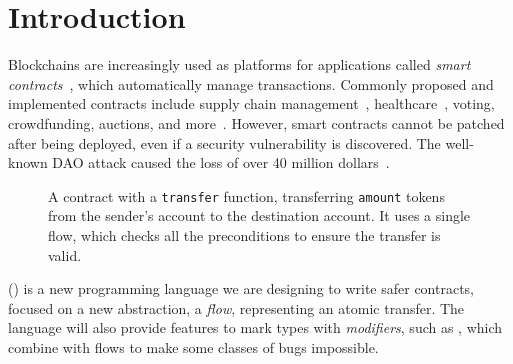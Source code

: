 \documentclass[dvipsnames, sigplan, screen]{acmart}
\begin{document}
\section{Introduction}
Blockchains are increasingly used as platforms for applications called \emph{smart contracts}~\cite{Szabo97:Formalizing}, which automatically manage transactions. %
Commonly proposed and implemented contracts include supply chain management~\cite{SupplyChainUse}, healthcare~\cite{HealthcareUse}, voting, crowdfunding, auctions, and more~\cite{Elsden18:Making}.
However, smart contracts cannot be patched after being deployed, even if a security vulnerability is discovered.
The well-known DAO attack caused the loss of over 40 million dollars~\cite{DAO}.
\begin{figure}[!b]
    \centering
    
    \vspace{-1em}
    \caption{A \langName contract with a \lstinline{transfer} function, transferring \lstinline{amount} tokens from the sender's account to the destination account.
It uses a single flow, which checks all the preconditions to ensure the transfer is valid.}
    \label{fig:erc20-transfer-flow}
\end{figure}

\langName (\langNamePronounce) is a new programming language we are designing to write safer contracts, focused on a new abstraction, a \emph{flow}, representing an atomic transfer.
The \langName language will also provide features to mark types with \emph{modifiers}, such as , which combine with flows to make some classes of bugs impossible.
\end{document}
